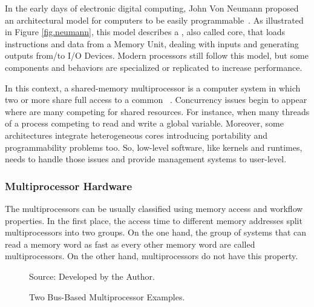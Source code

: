 		In the early days of electronic digital computing, John Von Neumann
		proposed an architectural model for computers to be easily programmable~\cite{von-neumann:model}.
		As illustrated in Figure \ref{fig.neumann}, this model describes a \cpu,
		also called core, that loads instructions and data from a Memory Unit,
		dealing with inputs and generating outputs from/to I/O Devices.
		Modern processors still follow this model, but some components and
		behaviors are specialized or replicated to increase performance.

		In this context, a shared-memory multiprocessor is a computer system
		in which two or more \cpus share full access to a common \ram~\cite{tanenbaum:4ed}.
		Concurrency issues begin to appear where are many \cpus competing for
		shared resources.
		For instance, when many threads of a process competing to read and write a global variable.
		Moreover, some architectures integrate heterogeneous cores introducing portability
		and programmability problems too.
		So, low-level software, like \os kernels and runtimes, needs to handle those
		issues and provide management systems to user-level.

		\subsubsection{Multiprocessor Hardware}
		\label{sec.multiprocessor-hw}

			The multiprocessors can be usually classified using memory access
			and workflow properties.
			In the first place, the access time to different memory addresses
			split multiprocessors into two groups.
			On the one hand, the group of systems that can read a memory word
			as fast as every other memory word are called \uma multiprocessors.
			On the other hand, \numa multiprocessors do not have this property.

			\begin{figure}[h]
				\centering
				\caption{Two Bus-Based \uma Multiprocessor Examples.}

				\qquad
				
				Source: Developed by the Author.

				\label{fig:uma}%
			\end{figure}

